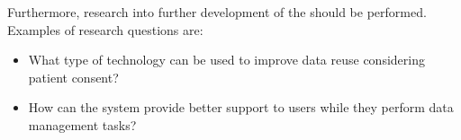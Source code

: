 Furthermore, research into further development of the \ivfsystem{} should be performed.
Examples of research questions are:

\begin{itemize}
	\item What type of technology can be used to improve data reuse considering patient consent?
	\item How can the system provide better support to users while they perform data management tasks?
\end{itemize}